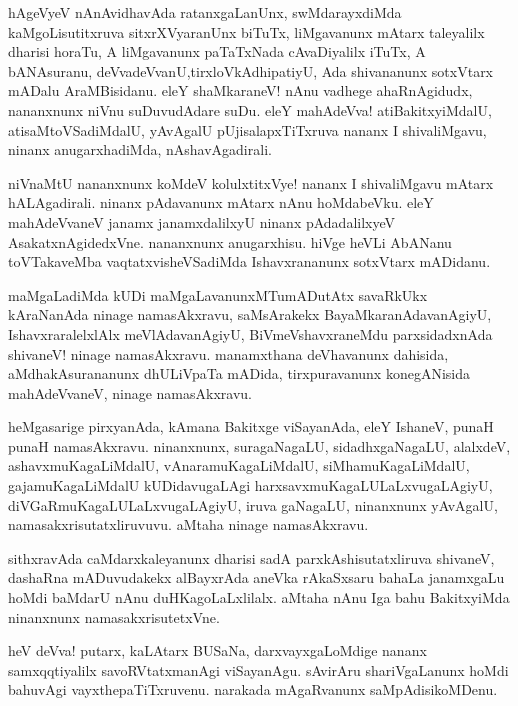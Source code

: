\documentclass{article}
\begin{document}
\begin{mn}
hAgeVyeV nAnAvidhavAda ratanxgaLanUnx, swMdarayxdiMda kaMgoLisutitxruva sitxrXVyaranUnx biTuTx,
liMgavanunx mAtarx taleyalilx dharisi horaTu, A liMgavanunx paTaTxNada cAvaDiyalilx iTuTx,
A bANAsuranu, deVvadeVvanU,tirxloVkAdhipatiyU, Ada shivananunx sotxVtarx mADalu AraMBisidanu. eleY
shaMkaraneV! nAnu vadhege ahaRnAgidudx, nananxnunx niVnu suDuvudAdare suDu. eleY mahAdeVva! 
atiBakitxyiMdalU, atisaMtoVSadiMdalU, yAvAgalU pUjisalapxTiTxruva nananx I shivaliMgavu, ninanx
anugarxhadiMda, nAshavAgadirali.
\end{mn}

\begin{mn}
niVnaMtU nananxnunx koMdeV kolulxtitxVye! nananx I shivaliMgavu mAtarx hALAgadirali. ninanx 
pAdavanunx mAtarx nAnu hoMdabeVku. eleY mahAdeVvaneV janamx janamxdalilxyU ninanx pAdadalilxyeV 
AsakatxnAgidedxVne. nananxnunx anugarxhisu. hiVge heVLi AbANanu toVTakaveMba vaqtatxvisheVSadiMda
Ishavxrananunx sotxVtarx mADidanu. 
\end{mn}

\begin{mn}
maMgaLadiMda kUDi maMgaLavanunxMTumADutAtx savaRkUkx kAraNanAda ninage namasAkxravu, 
saMsArakekx BayaMkaranAdavanAgiyU, IshavxraralelxlAlx meVlAdavanAgiyU, BiVmeVshavxraneMdu 
parxsidadxnAda shivaneV! ninage namasAkxravu. manamxthana deVhavanunx dahisida, aMdhakAsurananunx 
dhULiVpaTa mADida, tirxpuravanunx konegANisida mahAdeVvaneV, ninage namasAkxravu.
\end{mn}

\begin{mn}
heMgasarige pirxyanAda, kAmana Bakitxge viSayanAda, eleY IshaneV, punaH punaH namasAkxravu.
ninanxnunx, suragaNagaLU, sidadhxgaNagaLU, alalxdeV, ashavxmuKagaLiMdalU, vAnaramuKagaLiMdalU,
siMhamuKagaLiMdalU, gajamuKagaLiMdalU kUDidavugaLAgi harxsavxmuKagaLULaLxvugaLAgiyU, 
diVGaRmuKagaLULaLxvugaLAgiyU, iruva gaNagaLU, ninanxnunx yAvAgalU, namasakxrisutatxliruvuvu. 
aMtaha ninage namasAkxravu.
\end{mn}

\begin{mn}
sithxravAda caMdarxkaleyanunx dharisi sadA parxkAshisutatxliruva shivaneV, dashaRna mADuvudakekx 
alBayxrAda aneVka rAkaSxsaru bahaLa janamxgaLu hoMdi baMdarU nAnu duHKagoLaLxlilalx. aMtaha nAnu
Iga bahu BakitxyiMda ninanxnunx namasakxrisutetxVne.
\end{mn}

\begin{mn}
heV deVva! putarx, kaLAtarx BUSaNa, darxvayxgaLoMdige nananx samxqqtiyalilx savoRVtatxmanAgi 
viSayanAgu. sAvirAru shariVgaLanunx hoMdi bahuvAgi vayxthepaTiTxruvenu. narakada mAgaRvanunx
saMpAdisikoMDenu.
\end{mn}
\end{document}
